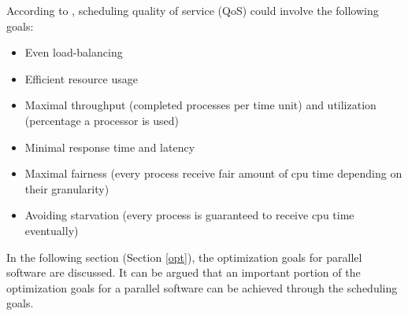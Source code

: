 According to \cite{lukas1}, scheduling quality of service (QoS) could involve the following goals:
\begin{itemize}
	\item Even load-balancing
	\item Efficient resource usage 
	\item Maximal throughput (completed processes per time unit) and utilization (percentage a processor is used)
	\item Minimal response time and latency
	\item Maximal fairness (every process receive fair amount of cpu time depending on their granularity)
	\item Avoiding starvation (every process is guaranteed to receive cpu time eventually)
\end{itemize}
In the following section (Section \ref{opt}), the optimization goals for parallel software are discussed. It can be argued that an important portion of the optimization goals for a parallel software can be achieved through the scheduling goals.

